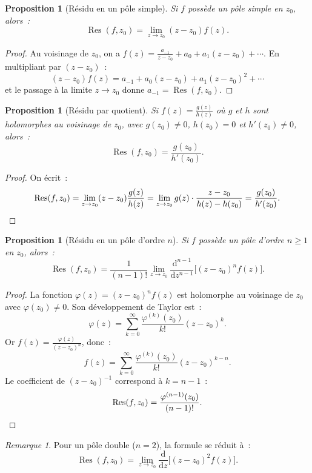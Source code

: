 \documentclass[12pt,a4paper,openany]{book}
\theoremstyle{definition}
\theoremstyle{plain}
\newtheorem{proposition}[definition]{Proposition}
\theoremstyle{remark}
\newtheorem{remarque}[definition]{Remarque}
\DeclareMathOperator{\Res}{Res}
\newcommand{\dd}{\mathrm{d}}
\begin{document}
\begin{proposition}[Résidu en un pôle simple]\label{prop:residu-pole-simple}
Si $f$ possède un pôle simple en $z_0$, alors~:
\[
  \Res(f, z_0) = \lim_{z \to z_0} (z - z_0) f(z).
\]
\end{proposition}

\begin{proof}
Au voisinage de $z_0$, on a $f(z) = \frac{a_{-1}}{z - z_0} + a_0 + a_1(z-z_0) + \cdots$.
En multipliant par $(z - z_0)$~:
\[
  (z - z_0) f(z) = a_{-1} + a_0 (z-z_0) + a_1 (z-z_0)^2 + \cdots
\]
et le passage à la limite $z \to z_0$ donne $a_{-1} = \Res(f, z_0)$.
\end{proof}

\begin{proposition}[Résidu par quotient]\label{prop:residu-quotient}
Si $f(z) = \frac{g(z)}{h(z)}$ où $g$ et $h$ sont holomorphes au voisinage de $z_0$,
avec $g(z_0) \neq 0$, $h(z_0) = 0$ et $h'(z_0) \neq 0$, alors~:
\[
  \Res(f, z_0) = \frac{g(z_0)}{h'(z_0)}.
\]
\end{proposition}

\begin{proof}
On écrit~:
\[
  \Res(f, z_0) = \lim_{z \to z_0} (z - z_0) \frac{g(z)}{h(z)}
  = \lim_{z \to z_0} g(z) \cdot \frac{z - z_0}{h(z) - h(z_0)}
  = \frac{g(z_0)}{h'(z_0)}. \qedhere
\]
\end{proof}

\begin{proposition}[Résidu en un pôle d'ordre $n$]\label{prop:residu-pole-ordre-n}
Si $f$ possède un pôle d'ordre $n \geq 1$ en $z_0$, alors~:
\[
  \Res(f, z_0) = \frac{1}{(n-1)!} \lim_{z \to z_0}
  \frac{\dd^{n-1}}{\dd z^{n-1}} \bigl[ (z-z_0)^n f(z) \bigr].
\]
\end{proposition}

\begin{proof}
La fonction $\varphi(z) = (z-z_0)^n f(z)$ est holomorphe au voisinage de $z_0$
avec $\varphi(z_0) \neq 0$. Son développement de Taylor est~:
\[
  \varphi(z) = \sum_{k=0}^{\infty} \frac{\varphi^{(k)}(z_0)}{k!} (z - z_0)^k.
\]
Or $f(z) = \frac{\varphi(z)}{(z-z_0)^n}$, donc~:
\[
  f(z) = \sum_{k=0}^{\infty} \frac{\varphi^{(k)}(z_0)}{k!} (z - z_0)^{k-n}.
\]
Le coefficient de $(z-z_0)^{-1}$ correspond à $k = n-1$~:
\[
  \Res(f, z_0) = \frac{\varphi^{(n-1)}(z_0)}{(n-1)!}. \qedhere
\]
\end{proof}

\begin{remarque}\label{rem:pole-double}
Pour un pôle double ($n=2$), la formule se réduit à~:
\[
  \Res(f, z_0) = \lim_{z \to z_0} \frac{\dd}{\dd z} \bigl[ (z-z_0)^2 f(z) \bigr].
\]
\end{remarque}
\end{document}
